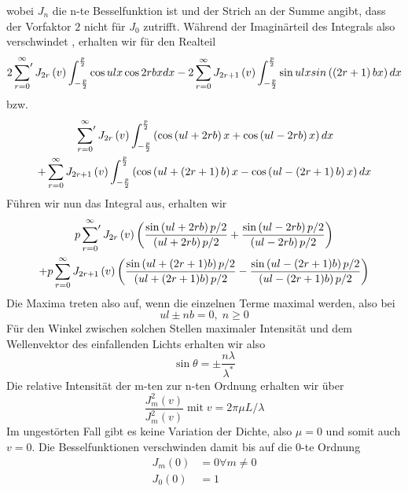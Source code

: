 wobei $J_{n}$ die n-te Besselfunktion ist und der Strich an der Summe angibt, dass der Vorfaktor $2$ nicht für $J_{0}$ zutrifft. Während der Imaginärteil des Integrals also verschwindet \cite{Raman}, erhalten wir für den Realteil
\begin{equation}
 2 \sideset{}{'} \sum_{r=0}^{\infty} J_{2r} \left( v \right) \int_{-\frac{p}{2}}^{\frac{p}{2}} \cos ulx \cos 2rbx dx - 2 \sum_{r=0}^{\infty} J_{2r+1} \left( v \right) \int_{-\frac{p}{2}}^{\frac{p}{2}} \sin ulx sin \left( \left( 2r+1 \right) bx \right) dx
\end{equation}
bzw.
\begin{multline}
 \sideset{}{'} \sum_{r=0}^{\infty} J_{2r} \left( v \right) \int_{-\frac{p}{2}}^{\frac{p}{2}} \left( \cos \left( ul + 2rb \right)x + \cos \left( ul - 2rb \right)x \right) dx \\
 + \sum_{r=0}^{\infty} J_{2r+1} \left( v \right) \int_{-\frac{p}{2}}^{\frac{p}{2}} \left( \cos \left( ul + \left(  2r+1 \right) b \right)x - \cos \left( ul - \left(  2r+1 \right) b \right)x  \right) dx
\end{multline}
Führen wir nun das Integral aus, erhalten wir
\begin{multline}
 p \sideset{}{'} \sum_{r=0}^{\infty} J_{2r} \left( v \right) \left( \frac{\sin \left(ul+2rb\right)p/2}{\left(ul+2rb\right)p/2} + \frac{\sin \left(ul-2rb\right)p/2}{\left(ul-2rb\right)p/2} \right) \\
 + p \sum_{r=0}^{\infty} J_{2r+1} \left( v \right) \left( \frac{\sin \left(ul+(2r+1)b\right)p/2}{\left(ul+(2r+1)b\right)p/2} - \frac{\sin \left(ul-(2r+1)b\right)p/2}{\left(ul-(2r+1)b\right)p/2} \right)
\end{multline}
Die Maxima treten also auf, wenn die einzelnen Terme maximal werden, also bei
\begin{equation}
 ul \pm nb = 0,\;  n \geq 0
\end{equation}
Für den Winkel zwischen solchen Stellen maximaler Intensität und dem Wellenvektor des einfallenden Lichts erhalten wir also
\begin{equation}
  \sin \theta = \pm \frac{n \lambda}{\lambda^*} 
\end{equation}
Die relative Intensität der m-ten zur n-ten Ordnung erhalten wir über
\begin{equation}
  \frac{J_m^2(v)}{J_m^2(v)}  \; \text{mit} \; v = 2 \pi \mu L / \lambda
\end{equation}
Im ungestörten Fall gibt es keine Variation der Dichte, also $\mu = 0$ und somit auch $v=0$. Die Besselfunktionen verschwinden damit bis auf die 0-te Ordnung
\begin{align}
 J_m(0) & = 0 \forall m \neq 0 \\
 J_0(0) & = 1
\end{align}
 

